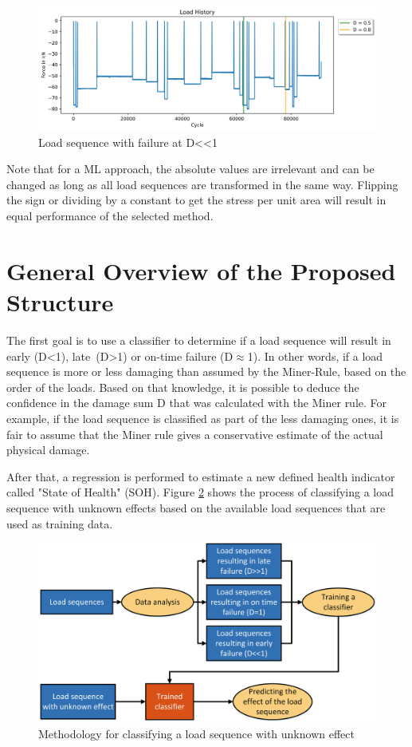 \begin{figure}[H]
	\centering
	\includegraphics[width=1\linewidth]{IMGs/Load/L2.jpg}
	\caption{Load sequence with failure at D<<1}
	\label{fig:L3}
\end{figure}

Note that for a ML approach, the absolute values are irrelevant and can be changed as long as all load sequences are transformed in the same way. Flipping the sign or dividing by a constant to get the stress per unit area will result in equal performance of the selected method.
\newpage
\section{General Overview of the Proposed Structure}\label{GO}
The first goal is to use a classifier to determine if a load sequence will result in early (D<1), late~(D>1) or on-time failure (D$\approx$1). In other words, if a load sequence is more or less damaging than assumed by the Miner-Rule, based on the order of the loads. Based on that knowledge, it is possible to deduce the confidence in the damage sum D that was calculated with the Miner rule. For example, if the load sequence is classified as part of the less damaging ones, it is fair to assume that the Miner rule gives a conservative estimate of the actual physical damage. 

After that, a regression is performed to estimate a new defined health indicator called "State of Health" (SOH). 
Figure \ref{fig:GeneralMethod1} shows the process of classifying a load sequence with unknown effects based on the available load sequences that are used as training data. 

\begin{figure}[H]
	\centering
	\includegraphics[width=0.95\linewidth]{IMGs/Method1.png}
	\caption{Methodology for classifying a load sequence with unknown effect}
	\label{fig:GeneralMethod1}
\end{figure}

